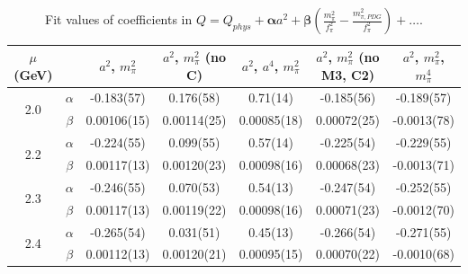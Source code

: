 \documentclass[12pt]{extarticle}
\begin{document}
\begin{table}[h!]
\begin{center}
\begin{tabular}{|c c|c|c|c|c|c|}
\hline
$\mu$ (GeV) &  & $a^2$, $m_\pi^2$& $a^2$, $m_\pi^2$ (no C)& $a^2$, $a^4$, $m_\pi^2$& $a^2$, $m_\pi^2$ (no M3, C2)& $a^2$, $m_\pi^2$, $m_\pi^4$\\
\hline
\multirow{2}{0.5in}{2.0} & $\alpha$ & -0.183(57)& 0.176(58)& 0.71(14)& -0.185(56)& -0.189(57)\\
 & $\beta$ & 0.00106(15)& 0.00114(25)& 0.00085(18)& 0.00072(25)& -0.0013(78)\\
\hline
\multirow{2}{0.5in}{2.2} & $\alpha$ & -0.224(55)& 0.099(55)& 0.57(14)& -0.225(54)& -0.229(55)\\
 & $\beta$ & 0.00117(13)& 0.00120(23)& 0.00098(16)& 0.00068(23)& -0.0013(71)\\
\hline
\multirow{2}{0.5in}{2.3} & $\alpha$ & -0.246(55)& 0.070(53)& 0.54(13)& -0.247(54)& -0.252(55)\\
 & $\beta$ & 0.00117(13)& 0.00119(22)& 0.00098(16)& 0.00071(23)& -0.0012(70)\\
\hline
\multirow{2}{0.5in}{2.4} & $\alpha$ & -0.265(54)& 0.031(51)& 0.45(13)& -0.266(54)& -0.271(55)\\
 & $\beta$ & 0.00112(13)& 0.00120(21)& 0.00095(15)& 0.00070(22)& -0.0010(68)\\
\hline
\end{tabular}
\caption{Fit values of coefficients in $Q = Q_{phys} + \mathbf{\alpha} a^2 + \mathbf{\beta}\left(\frac{m_\pi^2}{f_\pi^2}-\frac{m_{\pi,PDG}^2}{f_\pi^2}\right) + \ldots$.}
\end{center}
\end{table}




















\clearpage
\end{document}
